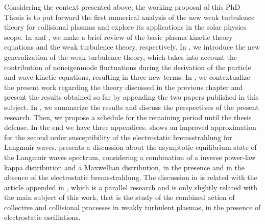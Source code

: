 \documentclass[12pt,a4paper,ruledheader]{report}
\begin{document}
Considering the context presented above, the working proposal of
this PhD Thesis is to put forward the first numerical analysis of
the new weak turbulence theory for collisional plasmas \cite{YZKS16}
and explore its applications in the solar physics scope. In
 and , we make a brief review
of the basic plasma kinetic theory equations and the weak turbulence
theory, respectively. In , we introduce the
new generalization of the weak turbulence theory, which takes into
account the contribution of noneigenmode fluctuations during the
derivation of the particle and wave kinetic equations, resulting
in three new terms. In , we contextualize the present
work regarding the theory discussed in the previous chapter and
present the results obtained so far by appending the two papers
published in this subject. In , we summarize the
results and discuss the perspectives of the present research.
Then, we propose a schedule for the remaining period 
until the thesis
defense. In the end we have three appendices.  shows
an improved approximation for the second order susceptibility of
the electrostatic bremsstrahlung for Langmuir waves. 
presents a discussion about the asymptotic equilibrium state of the
Langmuir waves spectrum, considering a combination of a inverse
power-law kappa distribution and a Maxwellian distribution, in the
presence and in the absence of the electrostatic bremsstrahlung.
The discussion in  is
related with the article appended in , which is a
parallel research and is only slightly related with the main
subject of this work, that is the study of the combined action
of collective and collisional processes in weakly turbulent
plasmas, in the presence of electrostatic oscillations.
\end{document}
